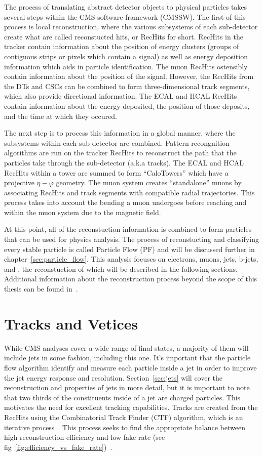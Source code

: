 The process of translating abstract detector objects to physical particles takes several steps within the CMS software framework (CMSSW).
The first of this process is local reconstruction, where the various subsystems of each sub-detector create what are called reconstucted hits, or RecHits for short.
RecHits in the tracker contain information about the position of energy clusters (groups of contiguous strips or pixels which contain a signal) as well as energy deposition information which aids in particle identification.
The muon RecHits ostensibly contain information about the position of the signal.
However, the RecHits from the DTs and CSCs can be combined to form three-dimensional track segments, which also provide directional information.
The ECAL and HCAL RecHits contain information about the energy deposited, the position of those deposits, and the time at which they occured.

The next step is to process this information in a global manner, where the subsystems within each sub-detector are combined.
Pattern recongnition algorithms are run on the tracker RecHits to reconstruct the path that the particles take through the sub-detector (a.k.a tracks).
The ECAL and HCAL RecHits within a tower are summed to form ``CaloTowers'' which have a projective $\eta-\varphi$ geometry.
The muon system creates ``standalone'' muons by associating RecHits and track segments with compatible radial trajectories.
This process takes into account the bending a muon undergoes before reaching and within the muon system due to the magnetic field.

At this point, all of the reconstuction information is combined to form particles that can be used for physics analysis.
The process of reconstucting and classifying every stable particle is called Particle Flow (PF) and will be discussed further in chapter~\ref{sec:particle_flow}.
This analysis focuses on electrons, muons, jets, b-jets, and \ETslash, the reconstuction of which will be described in the following sections.
Additional information about the reconstruction process beyond the scope of this thesis can be found in~\cite{TDR-software}.

\section{Tracks and Vetices}
\label{sec:tracks_and_vertices}

While CMS analyses cover a wide range of final states, a majority of them will include jets in some fashion, including this one.
It's important that the particle flow algorithm identify and measure each particle inside a jet in order to improve the jet energy response and resolution.
Section~\ref{sec:jets} will cover the reconstruction and properties of jets in more detail, but it is important to note that two thirds of the constituents inside of a jet are charged particles.
This motivates the need for excellent tracking capabilities.
Tracks are created from the RecHits using the Combinatorial Track Finder (CTF) algorithm, which is an iterative process~\cite{TrackingJINST}.
This process seeks to find the appropriate balance between high reconstruction efficiency and low fake rate (see fig~\ref{fig:efficiency_vs_fake_rate})~\cite{CMS-PAS-PFT-09-001}.

